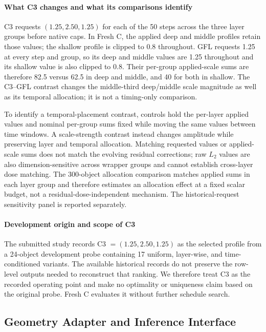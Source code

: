 \documentclass[times,twocolumn,final]{elsarticle}
\begin{document}
\paragraph{What C3 changes and what its comparisons identify}
C3 requests $(1.25,2.50,1.25)$ for each of the 50 steps across the three layer groups before native caps. In Fresh C, the applied deep and middle profiles retain those values; the shallow profile is clipped to 0.8 throughout. GFL requests 1.25 at every step and group, so its deep and middle values are 1.25 throughout and its shallow value is also clipped to 0.8. Their per-group applied-scale sums are therefore 82.5 versus 62.5 in deep and middle, and 40 for both in shallow. The C3--GFL contrast changes the middle-third deep/middle scale magnitude as well as its temporal allocation; it is not a timing-only comparison.

To identify a temporal-placement contrast, controls hold the per-layer applied values and nominal per-group sums fixed while moving the same values between time windows. A scale-strength contrast instead changes amplitude while preserving layer and temporal allocation. Matching requested values or applied-scale sums does not match the evolving residual corrections; raw $L_2$ values are also dimension-sensitive across wrapper groups and cannot establish cross-layer dose matching. The 300-object allocation comparison matches applied sums in each layer group and therefore estimates an allocation effect at a fixed scalar budget, not a residual-dose-independent mechanism. The historical-request sensitivity panel is reported separately.

\paragraph{Development origin and scope of C3}
The submitted study records C3 $=(1.25,2.50,1.25)$ as the selected profile from a 24-object development probe containing 17 uniform, layer-wise, and time-conditioned variants. The available historical records do not preserve the row-level outputs needed to reconstruct that ranking. We therefore treat C3 as the recorded operating point and make no optimality or uniqueness claim based on the original probe. Fresh C evaluates it without further schedule search.

\subsection{Geometry Adapter and Inference Interface}
\label{subsec:adapterimpl}
\end{document}
